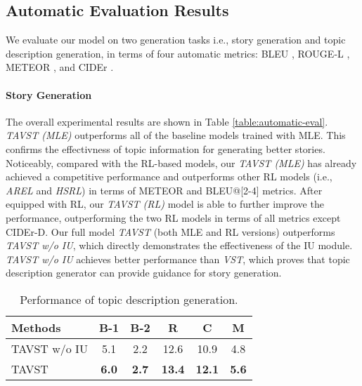 \documentclass[11pt]{article}
\newcommand{\citep}{\cite}
\begin{document}
\subsection{Automatic Evaluation Results}

We evaluate our model on two generation tasks i.e., story generation and topic description generation, in terms of four automatic metrics: BLEU \cite{papineni2002bleu}, ROUGE-L \citep{lin2004automatic}, METEOR \citep{banerjee2005meteor}, and CIDEr \citep{vedantam2015cider}.

\paragraph{Story Generation}
The overall experimental results are shown in Table \ref{table:automatic-eval}. \emph{TAVST (MLE)} outperforms all of the baseline models trained with MLE. This confirms the effectivness of topic information for generating better stories. Noticeably, compared with the RL-based models, our \emph{TAVST (MLE)} has already achieved a competitive performance and outperforms other RL models (i.e., \emph{AREL} and \emph{HSRL}) in terms of METEOR and BLEU@[2-4] metrics. After equipped with RL, our \emph{TAVST (RL)} model is able to further improve the performance, outperforming the two RL models in terms of all metrics except CIDEr-D. Our full model \emph{TAVST} (both MLE and RL versions) outperforms \emph{TAVST w/o IU}, which directly demonstrates the effectiveness of the IU module. \emph{TAVST w/o IU} achieves better performance than \emph{VST}, which proves that topic description generator can provide guidance for story generation.


\begin{wraptable}{r}{0.52\textwidth}
	\centering
		\vspace{-3.5mm}

	\begin{tabular}{lccccc}
		\hline
		Methods &B-1&B-2&R&C&M\\
		\hline
        TAVST w/o IU   & 5.1 & 2.2 & 12.6 &10.9 &4.8 \\
		TAVST  & \textbf{6.0} &\textbf{2.7} &\textbf{13.4} & \textbf{12.1} & \textbf{5.6}\\
		\hline
	\end{tabular}
	\smallskip
	\vspace{-3mm}

	\caption{ Performance of topic description generation.}
	\label{table:topic}
	\vspace{-2mm}
\end{wraptable}
\end{document}
